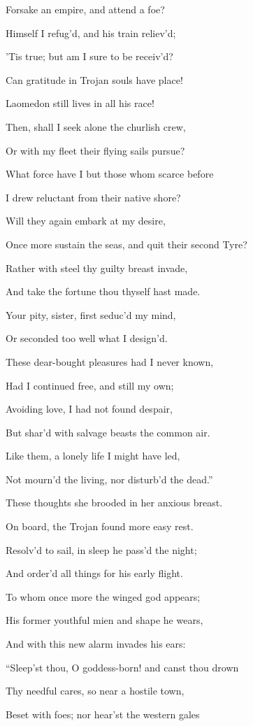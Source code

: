 Forsake an empire, and attend a foe?

Himself I refug’d, and his train reliev’d;

’Tis true; but am I sure to be receiv’d?

Can gratitude in Trojan souls have place!

Laomedon still lives in all his race!

Then, shall I seek alone the churlish crew,

Or with my fleet their flying sails pursue?

What force have I but those whom scarce before

I drew reluctant from their native shore?

Will they again embark at my desire,

Once more sustain the seas, and quit their second Tyre?

Rather with steel thy guilty breast invade,

And take the fortune thou thyself hast made.

Your pity, sister, first seduc’d my mind,

Or seconded too well what I design’d.

These dear-bought pleasures had I never known,

Had I continued free, and still my own;

Avoiding love, I had not found despair,

But shar’d with salvage beasts the common air.

Like them, a lonely life I might have led,

Not mourn’d the living, nor disturb’d the dead.”

These thoughts she brooded in her anxious breast.

On board, the Trojan found more easy rest.

Resolv’d to sail, in sleep he pass’d the night;

And order’d all things for his early flight.

To whom once more the winged god appears;

His former youthful mien and shape he wears,

And with this new alarm invades his ears:

“Sleep’st thou, O goddess-born! and canst thou drown

Thy needful cares, so near a hostile town,

Beset with foes; nor hear’st the western gales

